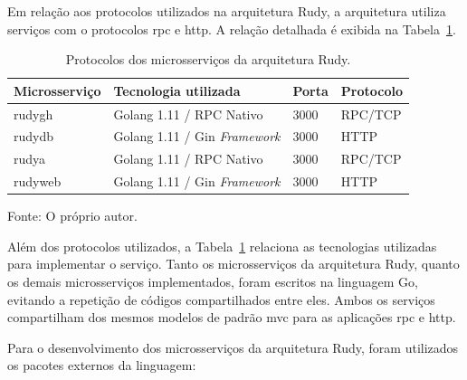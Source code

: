 Em relação aos protocolos utilizados na arquitetura Rudy, a arquitetura utiliza serviços com o protocolos \ac{rpc} e \ac{http}.
%
A relação detalhada é exibida na Tabela~\ref{tab:protocolos_rudy}.



\begin{table}[htb!]
    \centering
    \caption{Protocolos dos microsserviços da arquitetura Rudy.}
    \label{tab:protocolos_rudy}
    \begin{tabular}{|l|l|l|l|}
    \hline
    Microsserviço & Tecnologia utilizada                 & Porta & Protocolo \\ \hline
    rudygh        & Golang 1.11 / RPC Nativo             & 3000  & RPC/TCP       \\ \hline
    rudydb        & Golang 1.11 / Gin \textit{Framework} & 3000  & HTTP      \\ \hline
    rudya         & Golang 1.11 / RPC Nativo             & 3000  & RPC/TCP       \\ \hline
    rudyweb       & Golang 1.11 / Gin \textit{Framework} & 3000  & HTTP      \\ \hline
    \end{tabular}
    
    Fonte: O próprio autor.
\end{table}


Além dos protocolos utilizados, a Tabela~\ref{tab:protocolos_rudy} relaciona as tecnologias utilizadas para implementar o serviço.
%
Tanto os microsserviços da arquitetura Rudy, quanto os demais microsserviços implementados, foram escritos na linguagem Go, evitando a repetição de códigos compartilhados entre eles.
%
Ambos os serviços compartilham dos mesmos modelos de padrão \ac{mvc} para as aplicações \ac{rpc} e \ac{http}.

Para o desenvolvimento dos microsserviços da arquitetura Rudy, foram utilizados os pacotes externos da linguagem:

